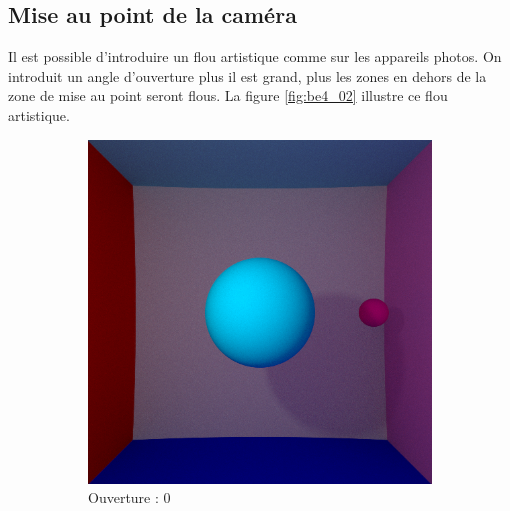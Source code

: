 \documentclass[12pt,a4paper,twoside]{report}
\begin{document}
\subsection{Mise au point de la caméra}

Il est possible d'introduire un flou artistique comme sur les appareils photos. On introduit un angle d'ouverture plus il est grand, plus les zones en dehors de la zone de mise au point seront flous. La figure \ref{fig:be4_02} illustre ce flou artistique.

\begin{figure}[H]
	\centering
	\begin{subfigure}{.45\textwidth}
		\centering
		\includegraphics[width=1.\linewidth]{be4_02_1000_1_0}
		\caption{Ouverture : $0$}
		\label{fig:be4_02_1000_1_0}
	\end{subfigure}
	\begin{subfigure}{.45\textwidth}
		\centering

\end{subfigure}
\end{figure}
\end{document}
